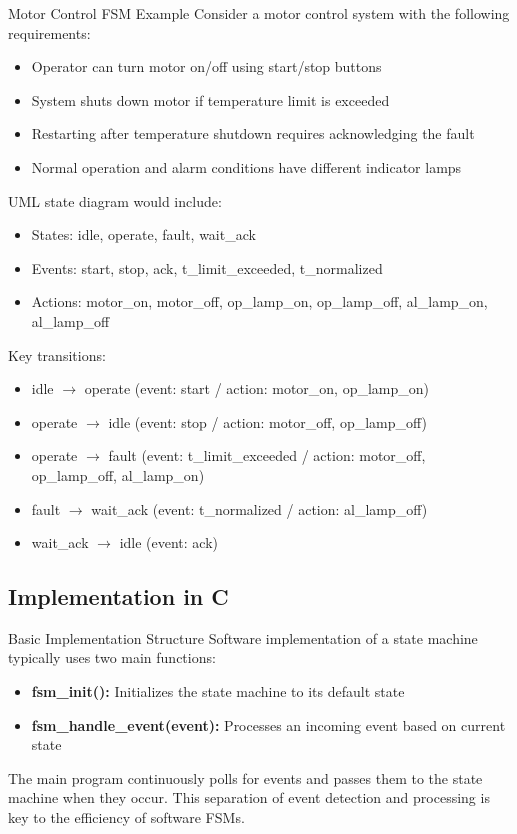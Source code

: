 \begin{example2}{Motor Control FSM Example}
Consider a motor control system with the following requirements:
\begin{itemize}
    \item Operator can turn motor on/off using start/stop buttons
    \item System shuts down motor if temperature limit is exceeded
    \item Restarting after temperature shutdown requires acknowledging the fault
    \item Normal operation and alarm conditions have different indicator lamps
\end{itemize}

UML state diagram would include:
\begin{itemize}
    \item States: idle, operate, fault, wait\_ack
    \item Events: start, stop, ack, t\_limit\_exceeded, t\_normalized
    \item Actions: motor\_on, motor\_off, op\_lamp\_on, op\_lamp\_off, al\_lamp\_on, al\_lamp\_off
\end{itemize}

Key transitions:
\begin{itemize}
    \item idle $\rightarrow$ operate (event: start / action: motor\_on, op\_lamp\_on)
    \item operate $\rightarrow$ idle (event: stop / action: motor\_off, op\_lamp\_off)
    \item operate $\rightarrow$ fault (event: t\_limit\_exceeded / action: motor\_off, op\_lamp\_off, al\_lamp\_on)
    \item fault $\rightarrow$ wait\_ack (event: t\_normalized / action: al\_lamp\_off)
    \item wait\_ack $\rightarrow$ idle (event: ack)
\end{itemize}
\end{example2}

\subsection{Implementation in C}

\begin{concept}{Basic Implementation Structure}
Software implementation of a state machine typically uses two main functions:
\begin{itemize}
    \item \textbf{fsm\_init():} Initializes the state machine to its default state
    \item \textbf{fsm\_handle\_event(event):} Processes an incoming event based on current state
\end{itemize}

The main program continuously polls for events and passes them to the state machine when they occur. This separation of event detection and processing is key to the efficiency of software FSMs.
\end{concept}

